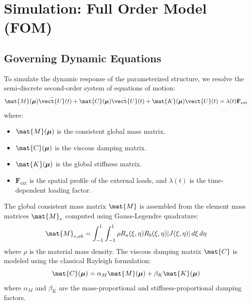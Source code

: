 \chapter{Simulation: Full Order Model (FOM)}
\label{ch:fom}

\section{Governing Dynamic Equations}
To simulate the dynamic response of the parameterized structure, we resolve the semi-discrete second-order system of equations of motion:
\begin{equation}
        \mat{M}(\boldsymbol{\mu}) \ddot{\vect{U}}(t) + \mat{C}(\boldsymbol{\mu}) \dot{\vect{U}}(t) + \mat{K}(\boldsymbol{\mu}) \vect{U}(t) = \lambda(t) \mathbf{F}_{\text{ext}}
\end{equation}
where:
\begin{itemize}
    \item $\mat{M}(\boldsymbol{\mu})$ is the consistent global mass matrix.
    \item $\mat{C}(\boldsymbol{\mu})$ is the viscous damping matrix.
    \item $\mat{K}(\boldsymbol{\mu})$ is the global stiffness matrix.
    \item $\mathbf{F}_{\text{ext}}$ is the spatial profile of the external loads, and $\lambda(t)$ is the time-dependent loading factor.
\end{itemize}

The global consistent mass matrix $\mat{M}$ is assembled from the element mass matrices $\mat{M}_{e}$ computed using Gauss-Legendre quadrature:
\begin{equation}
        \mat{M}_{e, ab} = \int_{-1}^{1} \int_{-1}^{1} \rho R_a(\xi, \eta) R_b(\xi, \eta) |J(\xi, \eta)| \, d\xi \, d\eta
\end{equation}
where $\rho$ is the material mass density. The viscous damping matrix $\mat{C}$ is modeled using the classical Rayleigh formulation:
\begin{equation}
        \mat{C}(\boldsymbol{\mu}) = \alpha_M \mat{M}(\boldsymbol{\mu}) + \beta_K \mat{K}(\boldsymbol{\mu})
\end{equation}
where $\alpha_M$ and $\beta_K$ are the mass-proportional and stiffness-proportional damping factors.

